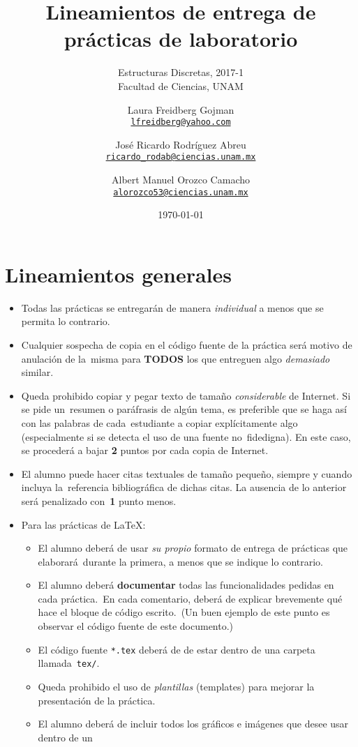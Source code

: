 \documentclass[paper=letter, fontsize=12pt]{scrartcl}
\title{Lineamientos de entrega de prácticas de laboratorio}
\subtitle{
  Estructuras Discretas, 2017-1\\
  Facultad de Ciencias, UNAM
}
\author{
  \normalsize
  Laura Freidberg Gojman\\
  \normalsize
  \texttt{\href{mailto:lfreidberg@yahoo.com}{lfreidberg@yahoo.com}}
  \and
  \normalsize
  José Ricardo Rodríguez Abreu\\
  \normalsize
  \texttt{\href{mailto:ricardo_rodab@ciencias.unam.mx}{ricardo\_rodab@ciencias.unam.mx}}
  \and
  \normalsize
  Albert Manuel Orozco Camacho\\
  \normalsize
  \texttt{\href{mailto:alorozco53@ciencias.unam.mx}{alorozco53@ciencias.unam.mx}}
}
\date{\today}
\begin{document}
\maketitle

\section*{Lineamientos generales}

\begin{itemize}
\item Todas las prácticas se entregarán de manera \emph{individual} a menos que se permita lo contrario.
\item Cualquier sospecha de copia en el código fuente de la práctica será motivo de anulación de la\
  misma para \textbf{TODOS} los que entreguen algo \emph{demasiado} similar.
\item Queda prohibido copiar y pegar texto de tamaño \emph{considerable} de Internet. Si se pide un\
  resumen o paráfrasis de algún tema, es preferible que se haga así con las palabras de cada\
  estudiante a copiar explícitamente algo (especialmente si se detecta el uso de una fuente no\
  fidedigna). En este caso, se procederá a bajar \textbf{2} puntos por cada copia de Internet.
\item El alumno puede hacer citas textuales de tamaño pequeño, siempre y cuando incluya la\
  referencia bibliográfica de dichas citas. La ausencia de lo anterior será penalizado con\
  \textbf{1} punto menos.
\item Para las prácticas de \LaTeX:
  \begin{itemize}
  \item El alumno deberá de usar \emph{su propio} formato de entrega de prácticas que elaborará\
    durante la primera, a menos que se indique lo contrario.
  \item El alumno deberá \textbf{documentar} todas las funcionalidades pedidas en cada práctica.\
    En cada comentario, deberá de explicar brevemente qué hace el bloque de código escrito.\
    (Un buen ejemplo de este punto es observar el código fuente de este documento.)
  \item El código fuente \texttt{*.tex} deberá de de estar dentro de una carpeta llamada\
    \texttt{tex/}.
  \item Queda prohibido el uso de \emph{plantillas} (templates) para mejorar la presentación
    de la práctica.
  \item El alumno deberá de incluir todos los gráficos e imágenes que desee usar dentro de un\

\end{itemize}
\end{itemize}
\end{document}
